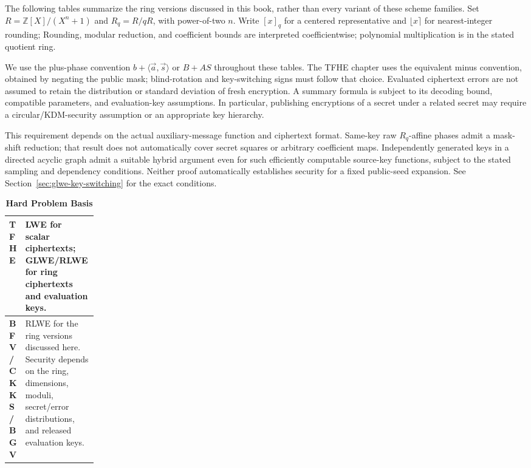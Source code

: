 The following tables summarize the ring versions discussed in this book, rather than every variant of these scheme families. Set $R=\mathbb Z[X]/(X^n+1)$ and $R_q=R/qR$, with power-of-two $n$. Write $[x]_q$ for a centered representative and $\lfloor x\rceil$ for nearest-integer rounding; Rounding, modular reduction, and coefficient bounds are interpreted coefficientwise; polynomial multiplication is in the stated quotient ring.

We use the plus-phase convention $b+\langle\vec a,\vec s\rangle$ or $B+AS$ throughout these tables. The TFHE chapter uses the equivalent minus convention, obtained by negating the public mask; blind-rotation and key-switching signs must follow that choice. Evaluated ciphertext errors are not assumed to retain the distribution or standard deviation of fresh encryption. A summary formula is subject to its decoding bound, compatible parameters, and evaluation-key assumptions. In particular, publishing encryptions of a secret under a related secret may require a circular/KDM-security assumption or an appropriate key hierarchy.

This requirement depends on the actual auxiliary-message function and ciphertext format. Same-key raw $R_q$-affine phases admit a mask-shift reduction; that result does not automatically cover secret squares or arbitrary coefficient maps. Independently generated keys in a directed acyclic graph admit a suitable hybrid argument even for such efficiently computable source-key functions, subject to the stated sampling and dependency conditions. Neither proof automatically establishes security for a fixed public-seed expansion. See Section~\ref{sec:glwe-key-switching} for the exact conditions.

\captionsetup{justification=raggedright,singlelinecheck=false,labelfont=bf}


\begin{table}[htbp]
\small
\renewcommand{\arraystretch}{1.15}
\begin{tabularx}{\linewidth}{|p{0.17\linewidth}|X|}
\hline
\textbf{TFHE}&LWE for scalar ciphertexts; GLWE/RLWE for ring ciphertexts and evaluation keys.\\\hline
\textbf{BFV / CKKS / BGV}&RLWE for the ring versions discussed here. Security depends on the ring, dimensions, moduli, secret/error distributions, and released evaluation keys.\\\hline
\end{tabularx}
\caption{\textbf{Hard Problem Basis}}
\end{table}


